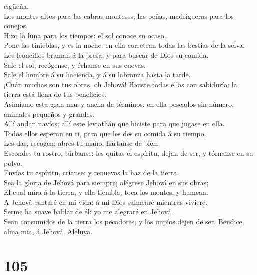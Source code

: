 cigüeña.\\
 Los montes altos para las cabras monteses; las peñas,
madrigueras para los conejos.\\
 Hizo la luna para los tiempos: el sol conoce su ocaso.\\
 Pone las tinieblas, y es la noche: en ella corretean todas
las bestias de la selva.\\
 Los leoncillos braman á la presa, y para buscar de Dios su
comida.\\
 Sale el sol, recógense, y échanse en sus cuevas.\\
 Sale el hombre á su hacienda, y á su labranza hasta la
tarde.\\
 ¡Cuán muchas son tus obras, oh Jehová! Hiciste todas ellas
con sabiduría: la tierra está llena de tus beneficios.\\
 Asimismo esta gran mar y ancha de términos: en ella
pescados sin número, animales pequeños y grandes.\\
 Allí andan navíos; allí este leviathán que hiciste para
que jugase en ella.\\
 Todos ellos esperan en ti, para que les des su comida á su
tiempo.\\
 Les das, recogen; abres tu mano, hártanse de bien.\\
 Escondes tu rostro, túrbanse: les quitas el espíritu,
dejan de ser, y tórnanse en su polvo.\\
 Envías tu espíritu, críanse: y renuevas la haz de la
tierra.\\
 Sea la gloria de Jehová para siempre; alégrese Jehová en
sus obras;\\
 El cual mira á la tierra, y ella tiembla; toca los montes,
y humean.\\
 A Jehová cantaré en mi vida: á mi Dios salmearé mientras
viviere.\\
 Serme ha suave hablar de él: yo me alegraré en Jehová.\\
 Sean consumidos de la tierra los pecadores, y los impíos
dejen de ser. Bendice, alma mía, á Jehová. Aleluya.

\hypertarget{section-104}{%
\section{105}\label{section-104}}

